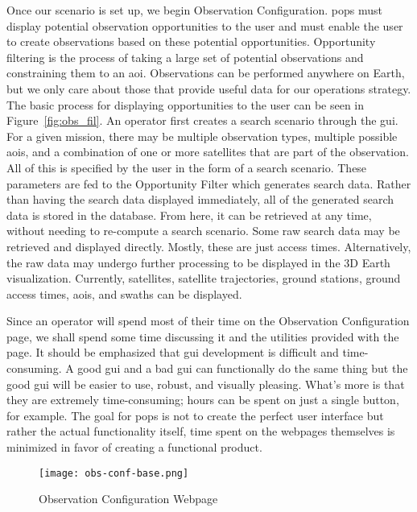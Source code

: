 Once our scenario is set up, we begin Observation Configuration. \gls{pops}
must display potential observation opportunities to the user and must enable
the user to create observations based on these potential opportunities.
Opportunity filtering is the process of taking a large set of potential
observations and constraining them to an \gls{aoi}. Observations can be
performed anywhere on Earth, but we only care about those that provide useful
data for our operations strategy.  The basic process for displaying
opportunities to the user can be seen in Figure~\ref{fig:obs_fil}. An operator
first creates a search scenario through the \gls{gui}.  For a given mission,
there may be multiple observation types, multiple possible \glspl{aoi}, and a
combination of one or more satellites that are part of the observation. All of
this is specified by the user in the form of a search scenario. These
parameters are fed to the Opportunity Filter which generates search data.
Rather than having the search data displayed immediately, all of the generated
search data is stored in the database. From here, it can be retrieved at any
time, without needing to re-compute a search scenario. Some raw search data may
be retrieved and displayed directly. Mostly, these are just access times.
Alternatively, the raw data may undergo further processing to be displayed in
the 3D Earth visualization. Currently, satellites, satellite trajectories,
ground stations, ground access times, \glspl{aoi}, and swaths can be displayed.


Since an operator will spend most of their time on the Observation
Configuration page, we shall spend some time discussing it and the utilities
provided with the page. It should be emphasized that \gls{gui}  development is
difficult and time-consuming. A good \gls{gui} and a bad \gls{gui} can
functionally do the same thing but the good \gls{gui} will be easier to use,
robust, and visually pleasing. What's more is that they are extremely
time-consuming; hours can be spent on just a single button, for example. The
goal for \gls{pops} is not to create the perfect user interface but rather the
actual functionality itself, time spent on the webpages themselves is minimized
in favor of creating a functional product. 

\begin{figure}
    \centering
    \texttt{[image: obs-conf-base.png]} 
    \caption{Observation Configuration Webpage}
    \label{fig:obs-conf-base} 
\end{figure}


